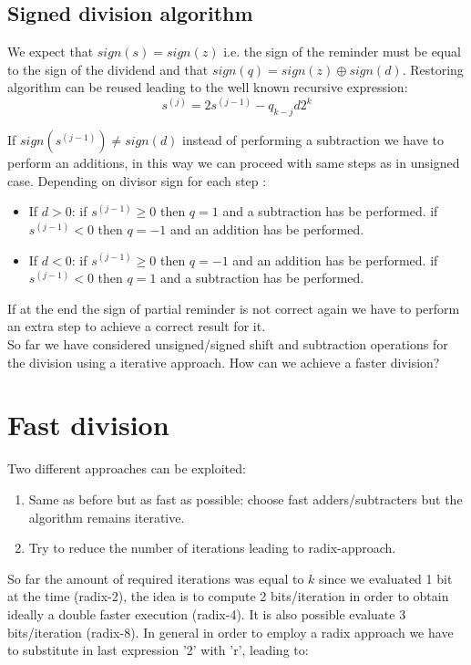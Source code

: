 \subsection{Signed division algorithm}

We expect that $sign(s)=sign(z)$ i.e. the sign of the reminder must be equal to the sign of the dividend and that $sign(q)=sign(z) \oplus sign(d)$. Restoring algorithm can be reused leading to the well known recursive expression:
$$s^{(j)}=2s^{(j-1)}-q_{k-j}d2^k$$

If $sign(s^{(j-1)}) \neq sign(d)$ instead of performing a subtraction we have to perform an additions, in this way we can proceed with same steps as in unsigned case. Depending on divisor sign for each step :
\begin{itemize}
  \item If $d>0$:
    \subitem if $s^{(j-1)} \geq 0$ then $q=1$ and a subtraction has be performed.
    \subitem if $s^{(j-1)} < 0$ then $q=-1$ and an addition has be performed.
  \item If $d<0$:
    \subitem if $s^{(j-1)} \geq 0$ then $q=-1$ and an addition has be performed.
    \subitem if $s^{(j-1)} < 0$ then $q=1$ and a subtraction has be performed.
\end{itemize}

If at the end the sign of partial reminder is not correct again we have to perform an extra step to achieve a correct result for it.\\

So far we have considered unsigned/signed shift and subtraction operations for the division using a iterative approach. How can we achieve a faster division?

\section{Fast division}
Two different approaches can be exploited:
\begin{enumerate}
  \item Same as before but as fast as possible: choose fast adders/subtracters but the algorithm remains iterative.
  \item Try to reduce the number of iterations leading to radix-approach.
\end{enumerate}

So far the amount of required iterations was equal to $k$ since we evaluated 1 bit at the time (radix-2), the idea is to compute 2 bits/iteration in order to obtain ideally a double faster execution (radix-4). It is also possible evaluate 3 bits/iteration (radix-8). In general in order to employ a radix approach we have to substitute in last expression '2' with 'r', leading to:

